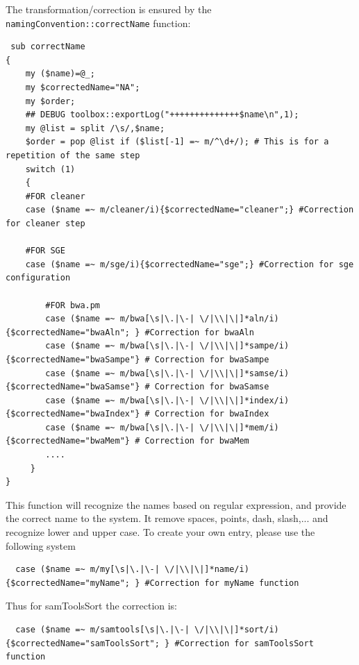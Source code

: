 \documentclass[a4paper,10pt]{report}
\begin{document}
The transformation/correction is ensured by the \texttt{namingConvention::correctName} function:

\begin{lstlisting}
 sub correctName
{
    my ($name)=@_;
    my $correctedName="NA";
    my $order;
    ## DEBUG toolbox::exportLog("++++++++++++++$name\n",1);
    my @list = split /\s/,$name;
    $order = pop @list if ($list[-1] =~ m/^\d+/); # This is for a repetition of the same step
    switch (1)
    {
	#FOR cleaner
	case ($name =~ m/cleaner/i){$correctedName="cleaner";} #Correction for cleaner step
	
	#FOR SGE
	case ($name =~ m/sge/i){$correctedName="sge";} #Correction for sge configuration
	
        #FOR bwa.pm
        case ($name =~ m/bwa[\s|\.|\-| \/|\\|\|]*aln/i){$correctedName="bwaAln"; } #Correction for bwaAln
        case ($name =~ m/bwa[\s|\.|\-| \/|\\|\|]*sampe/i){$correctedName="bwaSampe"} # Correction for bwaSampe
        case ($name =~ m/bwa[\s|\.|\-| \/|\\|\|]*samse/i){$correctedName="bwaSamse"} # Correction for bwaSamse
        case ($name =~ m/bwa[\s|\.|\-| \/|\\|\|]*index/i){$correctedName="bwaIndex"} # Correction for bwaIndex
        case ($name =~ m/bwa[\s|\.|\-| \/|\\|\|]*mem/i){$correctedName="bwaMem"} # Correction for bwaMem
        ....
     }
}
\end{lstlisting}

This function will recognize the names based on regular expression, and provide the correct name to the system. It remove spaces, points, dash, slash,... and recognize lower and upper case.
To create your own entry, please use the following system

\begin{lstlisting}
  case ($name =~ m/my[\s|\.|\-| \/|\\|\|]*name/i){$correctedName="myName"; } #Correction for myName function
\end{lstlisting}

Thus for samToolsSort the correction is:
\begin{lstlisting}
  case ($name =~ m/samtools[\s|\.|\-| \/|\\|\|]*sort/i){$correctedName="samToolsSort"; } #Correction for samToolsSort function
\end{lstlisting}
\end{document}
